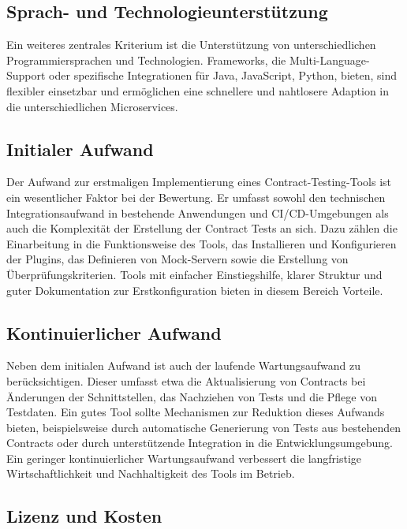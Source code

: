 \subsection{Sprach- und Technologieunterstützung}\label{subsec:frameworks_criterion_languagesupport}

Ein weiteres zentrales Kriterium ist die Unterstützung von unterschiedlichen Programmiersprachen und Technologien.
Frameworks, die Multi-Language-Support oder spezifische Integrationen für Java, JavaScript, Python, \etc bieten, sind flexibler einsetzbar und ermöglichen eine schnellere und nahtlosere Adaption in die unterschiedlichen Microservices.

\subsection{Initialer Aufwand}\label{subsec:frameworks_criterion_initialeffort}

Der Aufwand zur erstmaligen Implementierung eines Contract-Testing-Tools ist ein wesentlicher Faktor bei der Bewertung.
Er umfasst sowohl den technischen Integrationsaufwand in bestehende Anwendungen und \gls{CI}/\gls{CD}-Umgebungen als auch die Komplexität der Erstellung der Contract Tests an sich.
Dazu zählen \zB die Einarbeitung in die Funktionsweise des Tools, das Installieren und Konfigurieren der Plugins, das Definieren von \gls{Mock}-Servern sowie die Erstellung von Überprüfungskriterien.
Tools mit einfacher Einstiegshilfe, klarer Struktur und guter Dokumentation zur Erstkonfiguration bieten in diesem Bereich Vorteile.

\subsection{Kontinuierlicher Aufwand}\label{subsec:frameworks_criterion_continuouseffort}

Neben dem initialen Aufwand ist auch der laufende Wartungsaufwand zu berücksichtigen.
Dieser umfasst etwa die Aktualisierung von Contracts bei Änderungen der Schnittstellen, das Nachziehen von Tests und die Pflege von Testdaten.
Ein gutes Tool sollte Mechanismen zur Reduktion dieses Aufwands bieten, beispielsweise durch automatische Generierung von Tests aus bestehenden Contracts oder durch unterstützende Integration in die Entwicklungsumgebung.
Ein geringer kontinuierlicher Wartungsaufwand verbessert die langfristige Wirtschaftlichkeit und Nachhaltigkeit des Tools im Betrieb.

\subsection{Lizenz und Kosten}\label{subsec:frameworks_criterion_license}

